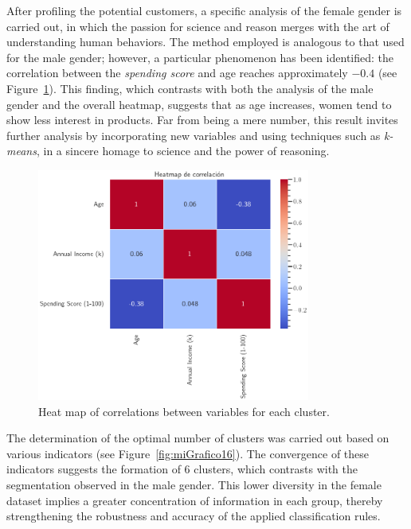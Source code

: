 \documentclass[10pt]{article}
\begin{document}
After profiling the potential customers, a specific analysis of the female gender is carried out, in which the passion for science and reason merges with the art of understanding human behaviors. The method employed is analogous to that used for the male gender; however, a particular phenomenon has been identified: the correlation between the \textit{spending score} and age reaches approximately \(-0.4\) (see Figure~\ref{fig:miGrafico15}). This finding, which contrasts with both the analysis of the male gender and the overall heatmap, suggests that as age increases, women tend to show less interest in products. Far from being a mere number, this result invites further analysis by incorporating new variables and using techniques such as \textit{k-means}, in a sincere homage to science and the power of reasoning.

\begin{figure}[h]
    \centering
    \includegraphics[width=0.8\textwidth]{plots_investing/Grafico 15.png}
    \caption{Heat map of correlations between variables for each cluster.}
    \label{fig:miGrafico15}
\end{figure}

The determination of the optimal number of clusters was carried out based on various indicators (see Figure~\ref{fig:miGrafico16}). The convergence of these indicators suggests the formation of 6 clusters, which contrasts with the segmentation observed in the male gender. This lower diversity in the female dataset implies a greater concentration of information in each group, thereby strengthening the robustness and accuracy of the applied classification rules.
\end{document}
